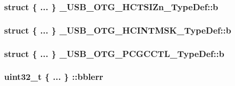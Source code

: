 \hypertarget{group___u_s_b___o_t_g___d_r_i_v_e_r_gacabd75f98a799b56f9fb7c935296b8aa}{
\subsubsection[{b}]{\setlength{\rightskip}{0pt plus 5cm}struct \{ ... \} 
   \-\_\-\-U\-S\-B\-\_\-\-O\-T\-G\-\_\-\-H\-C\-T\-S\-I\-Zn\-\_\-\-Type\-Def\-::b}}\label{group___u_s_b___o_t_g___d_r_i_v_e_r_gacabd75f98a799b56f9fb7c935296b8aa}
\hypertarget{group___u_s_b___o_t_g___d_r_i_v_e_r_ga63e6c6614333e12ec10ef3c0c003ae8f}{
\subsubsection[{b}]{\setlength{\rightskip}{0pt plus 5cm}struct \{ ... \} 
   \-\_\-\-U\-S\-B\-\_\-\-O\-T\-G\-\_\-\-H\-C\-I\-N\-T\-M\-S\-K\-\_\-\-Type\-Def\-::b}}\label{group___u_s_b___o_t_g___d_r_i_v_e_r_ga63e6c6614333e12ec10ef3c0c003ae8f}
\hypertarget{group___u_s_b___o_t_g___d_r_i_v_e_r_gab399c7093c52f61852ba9075ffda4665}{
\subsubsection[{b}]{\setlength{\rightskip}{0pt plus 5cm}struct \{ ... \} 
   \-\_\-\-U\-S\-B\-\_\-\-O\-T\-G\-\_\-\-P\-C\-G\-C\-C\-T\-L\-\_\-\-Type\-Def\-::b}}\label{group___u_s_b___o_t_g___d_r_i_v_e_r_gab399c7093c52f61852ba9075ffda4665}
\hypertarget{group___u_s_b___o_t_g___d_r_i_v_e_r_gad8aba0d0b30e801e736116dbd89f03b7}{
\subsubsection[{bblerr}]{\setlength{\rightskip}{0pt plus 5cm}uint32\-\_\-t \{ ... \} \-::bblerr}}\label{group___u_s_b___o_t_g___d_r_i_v_e_r_gad8aba0d0b30e801e736116dbd89f03b7}


